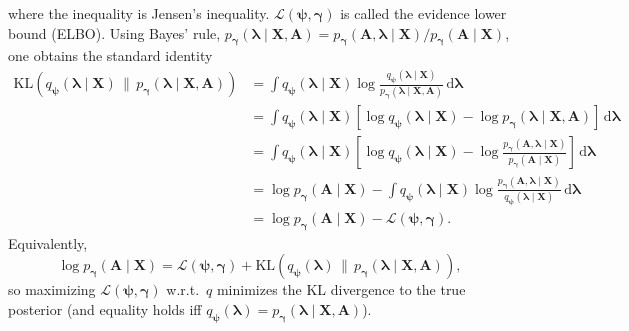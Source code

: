 where the inequality is Jensen's inequality. $\mathcal{L}(\boldsymbol{\psi},\boldsymbol{\gamma})$ is called the evidence lower bound (ELBO).
Using Bayes' rule,
\(
p_{\boldsymbol{\gamma}}(\boldsymbol{\lambda}\mid \mathbf{X},\mathbf{A})
=
p_{\boldsymbol{\gamma}}(\mathbf{A},\boldsymbol{\lambda}\mid \mathbf{X})/p_{\boldsymbol{\gamma}}(\mathbf{A}\mid \mathbf{X})
\),
one obtains the standard identity
\begin{align} \mathrm{KL}\!\left(q_{\boldsymbol{\psi}}(\boldsymbol{\lambda}\mid \mathbf{X})\,\|\,p_{\boldsymbol{\gamma}}(\boldsymbol{\lambda}\mid \mathbf{X},\mathbf{A})\right) 
    &= \int q_{\boldsymbol{\psi}}(\boldsymbol{\lambda}\mid \mathbf{X}) \log\frac{q_{\boldsymbol{\psi}}(\boldsymbol{\lambda}\mid \mathbf{X})}{p_{\boldsymbol{\gamma}}(\boldsymbol{\lambda}\mid \mathbf{X},\mathbf{A})}\, \mathrm{d}\boldsymbol{\lambda} \nonumber\\ 
    &= \int q_{\boldsymbol{\psi}}(\boldsymbol{\lambda}\mid \mathbf{X}) \left [ \log q_{\boldsymbol{\psi}}(\boldsymbol{\lambda}\mid \mathbf{X}) - \log {p_{\boldsymbol{\gamma}}(\boldsymbol{\lambda}\mid \mathbf{X},\mathbf{A})}\right ] \, \mathrm{d}\boldsymbol{\lambda} \nonumber\\ 
    &= \int q_{\boldsymbol{\psi}}(\boldsymbol{\lambda}\mid \mathbf{X}) \left [ \log q_{\boldsymbol{\psi}}(\boldsymbol{\lambda}\mid \mathbf{X}) - \log\frac{p_{\boldsymbol{\gamma}}(\mathbf{A},\boldsymbol{\lambda}\mid \mathbf{X})}{p_{\boldsymbol{\gamma}}(\mathbf{A}\mid \mathbf{X})}\right ] \, \mathrm{d}\boldsymbol{\lambda} \nonumber\\ 
    &= \log p_{\boldsymbol{\gamma}}(\mathbf{A}\mid \mathbf{X}) -\int q_{\boldsymbol{\psi}}(\boldsymbol{\lambda}\mid \mathbf{X}) \log\frac{p_{\boldsymbol{\gamma}}(\mathbf{A},\boldsymbol{\lambda}\mid \mathbf{X})}{q_{\boldsymbol{\psi}}(\boldsymbol{\lambda}\mid \mathbf{X})}\, \mathrm{d}\boldsymbol{\lambda} \nonumber\\ 
    &= \log p_{\boldsymbol{\gamma}}(\mathbf{A}\mid \mathbf{X}) - \mathcal{L}(\boldsymbol{\psi},\boldsymbol{\gamma}). 
    \label{eq:logp-elbo-kl} 
\end{align}
Equivalently,
\begin{equation}
\log p_{\boldsymbol{\gamma}}(\mathbf{A}\mid \mathbf{X})
=
\mathcal{L}(\boldsymbol{\psi},\boldsymbol{\gamma})
+
\mathrm{KL}\!\left(q_{\boldsymbol{\psi}}(\boldsymbol{\lambda})\,\|\,p_{\boldsymbol{\gamma}}(\boldsymbol{\lambda}\mid \mathbf{X},\mathbf{A})\right),
\label{eq:logp-decomp}
\end{equation}
so maximizing \(\mathcal{L}(\boldsymbol{\psi},\boldsymbol{\gamma})\) w.r.t.\ \(q\) minimizes the KL divergence to the true posterior (and equality holds iff \(q_{\boldsymbol{\psi}}(\boldsymbol{\lambda}) = p_{\boldsymbol{\gamma}}(\boldsymbol{\lambda}\mid \mathbf{X},\mathbf{A})\)). 
